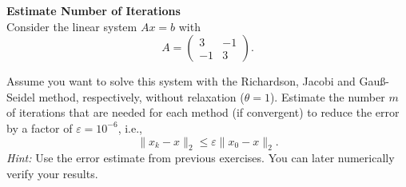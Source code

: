 \textbf{Estimate Number of Iterations}\\
Consider the linear system $Ax=b$ with
$$A=\begin{pmatrix}
3&-1\\-1&3
\end{pmatrix}.$$

Assume you want to solve this system with the Richardson, Jacobi and Gauß-Seidel method, respectively, without relaxation ($\theta = 1$). Estimate the number $m$ of iterations that are needed for each method (if convergent) to reduce the error by a factor of $\varepsilon=10^{-6}$, i.e.,
	$$\|x_k-x\|_2 \leq \varepsilon\|x_0-x\|_2.$$
	\textit{Hint: }Use the error estimate from previous exercises. You can later numerically verify your results.
